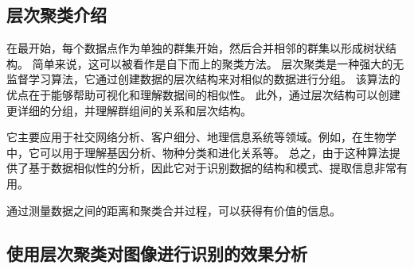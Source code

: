 \subsection{层次聚类介绍}
在最开始，每个数据点作为单独的群集开始，然后合并相邻的群集以形成树状结构。
简单来说，这可以被看作是自下而上的聚类方法。
层次聚类是一种强大的无监督学习算法，它通过创建数据的层次结构来对相似的数据进行分组。
该算法的优点在于能够帮助可视化和理解数据间的相似性。
此外，通过层次结构可以创建更详细的分组，并理解群组间的关系和层次结构。 \par

它主要应用于社交网络分析、客户细分、地理信息系统等领域。例如，在生物学中，它可以用于理解基因分析、物种分类和进化关系等。
总之，由于这种算法提供了基于数据相似性的分析，因此它对于识别数据的结构和模式、提取信息非常有用。 \par

通过测量数据之间的距离和聚类合并过程，可以获得有价值的信息。\par

\subsection{使用层次聚类对图像进行识别的效果分析}
\begin{figure}[H]
    \centering
    \quad
    \end{figure}
    
